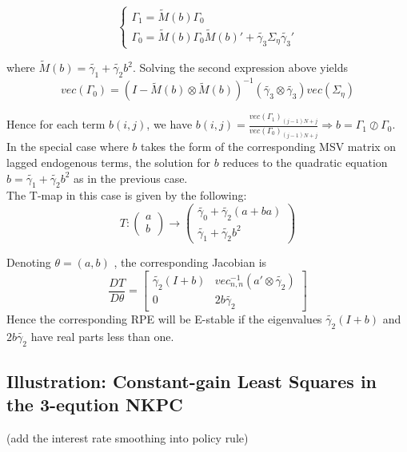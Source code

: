 \documentclass[12pt,reqno]{article}
\numberwithin{equation}{section}
\begin{document}
$$
\begin{cases}
\Gamma_1 = \tilde{M}(b) \Gamma_0 \\
\Gamma_0 = \tilde{M}(b) \Gamma_0 \tilde{M}(b)' + \tilde{\gamma_3}\Sigma_{\eta} \tilde{\gamma_3}' 
\end{cases}
$$

where $\tilde{M}(b) = \tilde{\gamma_1} + \tilde{\gamma_2} b^2$. Solving the second expression above yields 
$$ vec(\Gamma_0) = (I- \tilde{M}(b) \otimes \tilde{M}(b))^{-1} (\tilde{\gamma_3} \otimes \tilde{\gamma_3}) vec(\Sigma_{\eta}) $$

Hence for each term $b(i,j) $, we have $ b(i,j) = \frac{vec(\Gamma_1)_{(j-1)N+j}}{vec(\Gamma_0)_{(j-1)N+j}} \Rightarrow b = \Gamma_1 \oslash \Gamma_0 $. \\

In the special case where $ b $ takes the form of the corresponding MSV matrix on lagged endogenous terms, the solution for $ b $ reduces to the quadratic equation $ b = \tilde{\gamma_1 } + \tilde{\gamma_2 } b^2 $ as in the previous case. \\

The T-map in this case is given by the following: \\

$$
T: \begin{pmatrix} a \\ b \end{pmatrix}  \rightarrow \begin{pmatrix} \tilde{\gamma_0} + \tilde{\gamma_2} (a+ba) \\ \tilde{\gamma_1} + \tilde{\gamma_2} b^2 \end{pmatrix} 
$$

Denoting $ \theta = (a,b) $ , the corresponding Jacobian is \\

$$
\frac{DT}{ D \theta} = \begin{bmatrix}  \tilde{\gamma_2 } (I+b) & vec^{-1}_{n,n} ( a' \otimes \tilde{\gamma_2}) \\ 0 & 2 b \tilde{\gamma_2}  \end{bmatrix} 
$$
Hence the corresponding RPE will be E-stable if the eigenvalues $\tilde{\gamma_2} (I+b) $ and $ 2 b \tilde{\gamma_2} $ have real parts less than one. \\


\subsection{Illustration: Constant-gain Least Squares in the 3-eqution NKPC}
(add the interest rate smoothing into policy rule)\\
\end{document}
